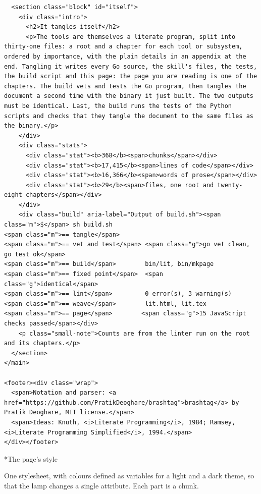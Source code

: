 \documentclass[10pt,a4paper]{article}
\makeatletter
\renewcommand\subsection{\@startsection{subsection}{2}{\z@}{-2.6ex \@plus -1ex \@minus -.2ex}{1ex \@plus .2ex}{\normalfont\Large\itshape}}
\newcounter{chunk}
\makeatother
\begin{document}
\begin{Verbatim}
  <section class="block" id="itself">
    <div class="intro">
      <h2>It tangles itself</h2>
      <p>The tools are themselves a literate program, split into thirty-one files: a root and a chapter for each tool or subsystem, ordered by importance, with the plain details in an appendix at the end. Tangling it writes every Go source, the skill's files, the tests, the build script and this page: the page you are reading is one of the chapters. The build vets and tests the Go program, then tangles the document a second time with the binary it just built. The two outputs must be identical. Last, the build runs the tests of the Python scripts and checks that they tangle the document to the same files as the binary.</p>
    </div>
    <div class="stats">
      <div class="stat"><b>368</b><span>chunks</span></div>
      <div class="stat"><b>17,415</b><span>lines of code</span></div>
      <div class="stat"><b>16,366</b><span>words of prose</span></div>
      <div class="stat"><b>29</b><span>files, one root and twenty-eight chapters</span></div>
    </div>
    <div class="build" aria-label="Output of build.sh"><span class="m">$</span> sh build.sh
<span class="m">== tangle</span>
<span class="m">== vet and test</span> <span class="g">go vet clean, go test ok</span>
<span class="m">== build</span>        bin/lit, bin/mkpage
<span class="m">== fixed point</span>  <span class="g">identical</span>
<span class="m">== lint</span>         0 error(s), 3 warning(s)
<span class="m">== weave</span>        lit.html, lit.tex
<span class="m">== page</span>        <span class="g">15 JavaScript checks passed</span></div>
    <p class="small-note">Counts are from the linter run on the root and its chapters.</p>
  </section>
</main>

<footer><div class="wrap">
  <span>Notation and parser: <a href="https://github.com/PratikDeoghare/brashtag">brashtag</a> by Pratik Deoghare, MIT license.</span>
  <span>Ideas: Knuth, <i>Literate Programming</i>, 1984; Ramsey, <i>Literate Programming Simplified</i>, 1994.</span>
</div></footer>
\end{Verbatim}

\hypertarget{h-The-page-s-style}{}
\subsection*{The page's style}

One stylesheet, with colours defined as variables for a light and a dark theme, so that the lamp changes a single attribute. Each part is a chunk.
\end{document}
